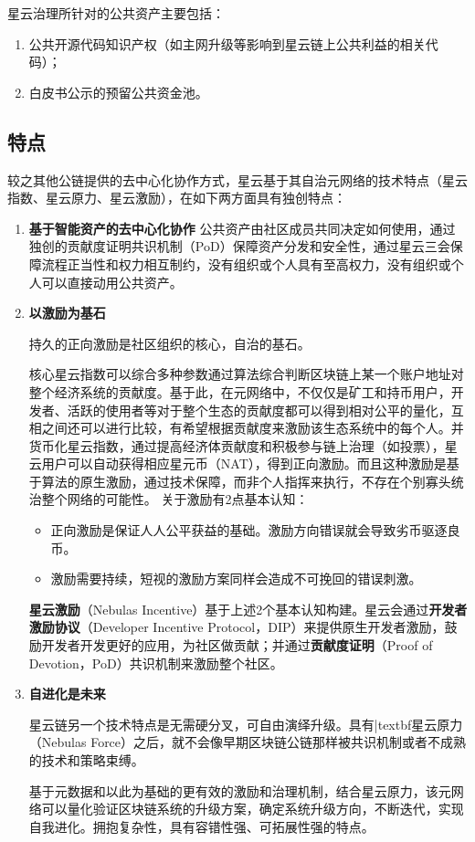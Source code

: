 星云治理所针对的公共资产主要包括：
\begin{enumerate}
	\item 公共开源代码知识产权（如主网升级等影响到星云链上公共利益的相关代码）；
	\item 白皮书公示的预留公共资金池。
\end{enumerate}

\subsection{特点}
较之其他公链提供的去中心化协作方式，星云基于其自治元网络的技术特点（星云指数、星云原力、星云激励），在如下两方面具有独创特点：

\begin{enumerate}
	\item \textbf{基于智能资产的去中心化协作}
	公共资产由社区成员共同决定如何使用，通过独创的贡献度证明共识机制（PoD）保障资产分发和安全性，通过星云三会保障流程正当性和权力相互制约，没有组织或个人具有至高权力，没有组织或个人可以直接动用公共资产。

	\item \textbf{以激励为基石}
	
	持久的正向激励是社区组织的核心，自治的基石。

	核心星云指数可以综合多种参数通过算法综合判断区块链上某一个账户地址对整个经济系统的贡献度。基于此，在元网络中，不仅仅是矿工和持币用户，开发者、活跃的使用者等对于整个生态的贡献度都可以得到相对公平的量化，互相之间还可以进行比较，有希望根据贡献度来激励该生态系统中的每个人。并货币化星云指数，通过提高经济体贡献度和积极参与链上治理（如投票），星云用户可以自动获得相应星元币（NAT），得到正向激励。而且这种激励是基于算法的原生激励，通过技术保障，而非个人指挥来执行，不存在个别寡头统治整个网络的可能性。
	关于激励有2点基本认知：
	\begin{itemize}
		\item 正向激励是保证人人公平获益的基础。激励方向错误就会导致劣币驱逐良币。
		\item 激励需要持续，短视的激励方案同样会造成不可挽回的错误刺激。
	\end{itemize}
	\textbf{星云激励}（Nebulas Incentive）基于上述2个基本认知构建。星云会通过\textbf{开发者激励协议}（Developer Incentive Protocol，DIP）来提供原生开发者激励，鼓励开发者开发更好的应用，为社区做贡献；并通过\textbf{贡献度证明}（Proof of Devotion，PoD）共识机制来激励整个社区。
	
	
	
	\item \textbf{自进化是未来}
	
	星云链另一个技术特点是无需硬分叉，可自由演绎升级。具有|textbf{星云原力}（Nebulas Force）之后，就不会像早期区块链公链那样被共识机制或者不成熟的技术和策略束缚。
	
	基于元数据和以此为基础的更有效的激励和治理机制，结合星云原力，该元网络可以量化验证区块链系统的升级方案，确定系统升级方向，不断迭代，实现自我进化。拥抱复杂性，具有容错性强、可拓展性强的特点。
\end{enumerate}

